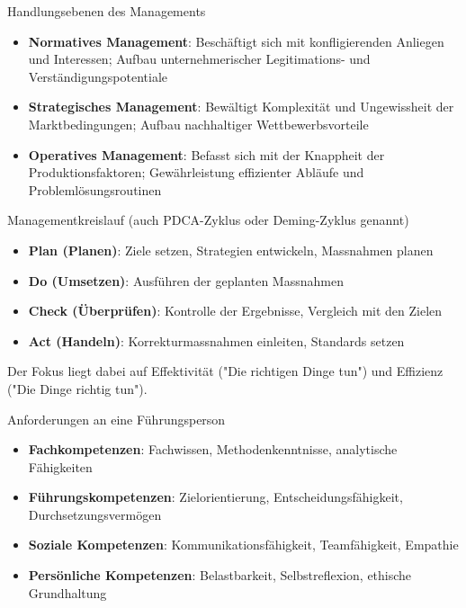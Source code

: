 \begin{concept}{Handlungsebenen des Managements}
\begin{itemize}
    \item \textbf{Normatives Management}: Beschäftigt sich mit konfligierenden Anliegen und Interessen; Aufbau unternehmerischer Legitimations- und Verständigungspotentiale
    \item \textbf{Strategisches Management}: Bewältigt Komplexität und Ungewissheit der Marktbedingungen; Aufbau nachhaltiger Wettbewerbsvorteile
    \item \textbf{Operatives Management}: Befasst sich mit der Knappheit der Produktionsfaktoren; Gewährleistung effizienter Abläufe und Problemlösungsroutinen
\end{itemize}
\end{concept}

\begin{concept}{Managementkreislauf} (auch PDCA-Zyklus oder Deming-Zyklus genannt) 
\begin{itemize}
    \item \textbf{Plan (Planen)}: Ziele setzen, Strategien entwickeln, Massnahmen planen
    \item \textbf{Do (Umsetzen)}: Ausführen der geplanten Massnahmen
    \item \textbf{Check (Überprüfen)}: Kontrolle der Ergebnisse, Vergleich mit den Zielen
    \item \textbf{Act (Handeln)}: Korrekturmassnahmen einleiten, Standards setzen
\end{itemize}

Der Fokus liegt dabei auf Effektivität ("Die richtigen Dinge tun") und Effizienz ("Die Dinge richtig tun").
\end{concept}

\begin{definition}{Anforderungen an eine Führungsperson}
\begin{itemize}
    \item \textbf{Fachkompetenzen}: Fachwissen, Methodenkenntnisse, analytische Fähigkeiten
    \item \textbf{Führungskompetenzen}: Zielorientierung, Entscheidungsfähigkeit, Durchsetzungsvermögen
    \item \textbf{Soziale Kompetenzen}: Kommunikationsfähigkeit, Teamfähigkeit, Empathie
    \item \textbf{Persönliche Kompetenzen}: Belastbarkeit, Selbstreflexion, ethische Grundhaltung
\end{itemize}
\end{definition}

